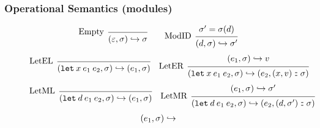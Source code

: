 \documentclass{beamer}
\theoremstyle{definition}
\newcommand*{\cons}{:{\hspace{-0.7em}}:}
\newcommand*{\modid}{d}
\newcommand*{\ctx}{\sigma}
\newcommand*{\semarrow}{\hookrightarrow}
\begin{document}
\begin{frame}[c]
  \frametitle{Operational Semantics (modules)}
  \begin{figure}[h!]
    \centering
    \scriptsize
    \begin{flushright}
      \fbox{$(e,\ctx)\semarrow V\text{ or }(e',\ctx')$}
    \end{flushright}
    \[
      \begin{prooftree}
        \infer[left label=Empty]0{
        (\varepsilon, \ctx)
        \semarrow
        \ctx
        }
      \end{prooftree}\qquad
      \begin{prooftree}
        \hypo{\ctx'=\ctx(\modid)}
        \infer[left label=ModID]1{
        (\modid, \ctx)
        \semarrow
        \ctx'
        }
      \end{prooftree}
    \]
    \[
      \begin{prooftree}
        \infer[left label=LetEL]0{
        (\mathtt{let}\:x\:e_1\:e_2, \ctx)
        \semarrow
        (e_{1}, \ctx)
        }
      \end{prooftree}\quad
      \begin{prooftree}
        \hypo{
          \begin{matrix}
            (e_{1}, \ctx)
            \semarrow
            v
          \end{matrix}
        }
        \infer[left label=LetER]1{
        (\mathtt{let}\:x\:e_1\:e_2, \ctx)
        \semarrow
        (e_{2}, (x, v)\cons \ctx)
        }
      \end{prooftree}
    \]
    \[
      \begin{prooftree}
        \infer[left label=LetML]0{
        (\mathtt{let}\:\modid\:e_{1}\:e_{2}, \ctx)
        \semarrow
        (e_{1}, \ctx)
        }
      \end{prooftree}\quad
      \begin{prooftree}
        \hypo{
          \begin{matrix}
            (e_{1}, \ctx)
            \semarrow
            \ctx'
          \end{matrix}
        }
        \infer[left label=LetMR]1{
        (\mathtt{let}\:\modid\:e_{1}\:e_{2}, \ctx)
        \semarrow
        (e_{2}, (\modid, \ctx')\cons \ctx)
        }
      \end{prooftree}
    \]
    \[
      \begin{prooftree}
        \hypo{
          \begin{matrix}
            (e_{1}, \ctx)
            \semarrow

\end{matrix}}
\end{prooftree}\]
\end{figure}
\end{frame}
\end{document}
